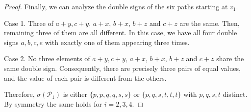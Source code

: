 \documentclass[10pt,a4paper]{amsart}
\begin{document}
\begin{proof}
\vspace{0.5cm}

Finally, we can analyze the double signs of the six paths starting at $v_1$.

Case 1. Three of $a+y,c+y$, $a+x$, $b+x$, $b+z$ and $c+z$ are the same. Then, remaining three of them are all different. In this case, we have all four double signs $a,b,c,e$ with exactly one of them appearing three times. 

Case 2. No three elements of $a+y,c+y$, $a+x$, $b+x$, $b+z$ and $c+z$  share the same double sign. Consequently, there are
precisely three pairs of equal values, and the value of each pair is
different from the others.

\vspace{0.5cm}

Therefore, \(\sigma(\mathscr P_1)\) is either \(\{p,p,q,q,s,s\}\) or
\(\{p,q,s,t,t,t\}\) with \(p,q,s,t\) distinct. By symmetry the same holds for
\(i=2,3,4\).
\end{proof}
\end{document}
